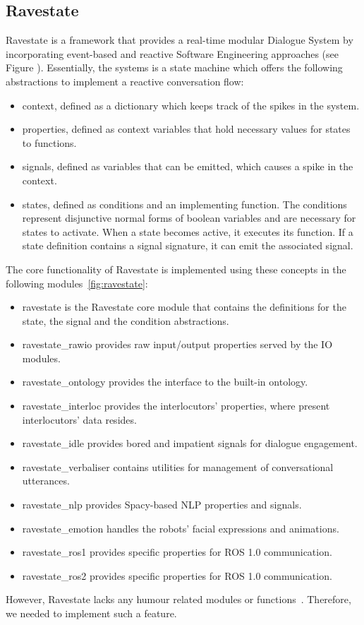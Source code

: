\subsection{Ravestate}

Ravestate is a framework that provides a real-time modular Dialogue System by incorporating event-based and reactive Software Engineering approaches (see Figure ). Essentially, the systems is a state machine which offers the following abstractions to implement a reactive conversation flow:

\begin{itemize}
    \item context, defined as a dictionary which keeps track of the spikes in the system.
    \item properties, defined as context variables that hold necessary values for states to functions.
    \item signals, defined as variables that can be emitted, which causes a spike in the context.
    \item states, defined as conditions and an implementing function. The conditions represent disjunctive normal forms of boolean variables and are necessary for states to activate. When a state becomes active, it executes its function. If a state definition contains a signal signature, it can emit the associated signal. 
\end{itemize}

The core functionality of Ravestate is implemented using these concepts in the following modules~\ref{fig:ravestate}:
\begin{itemize}
    \item ravestate is the Ravestate core module that contains the definitions for the state, the signal and the condition abstractions.
    \item ravestate\_rawio provides raw input/output properties served by the IO modules.
    \item ravestate\_ontology provides the interface to the built-in ontology.
    \item ravestate\_interloc provides the interlocutors' properties, where present interlocutors' data resides.
    \item ravestate\_idle provides bored and impatient signals for dialogue engagement.
    \item ravestate\_verbaliser contains utilities for management of conversational utterances.
    \item ravestate\_nlp provides Spacy-based NLP properties and signals.
    \item ravestate\_emotion handles the robots' facial expressions and animations. 
    \item ravestate\_ros1 provides specific properties for ROS 1.0 communication.
    \item ravestate\_ros2 provides specific properties for ROS 1.0 communication.
\end{itemize}
However, Ravestate lacks any humour related modules or functions~\parencite{ravestate}. Therefore, we needed to implement such a feature. 

